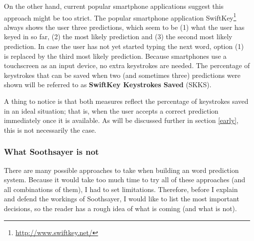 \documentclass[12pt]{article}
\begin{document}
On the other hand, current popular smartphone applications suggest this approach might be too strict. The popular smartphone application SwiftKey\footnote{\url{http://www.swiftkey.net/}} always shows the user three predictions, which seem to be (1) what the user has keyed in so far, (2) the most likely prediction and (3) the second most likely prediction. In case the user has not yet started typing the next word, option (1) is replaced by the third most likely prediction. Because smartphones use a touchscreen as an input device, no extra keystrokes are needed. The percentage of keystrokes that can be saved when two (and sometimes three) predictions were shown will be referred to as \textbf{SwiftKey Keystrokes Saved} (SKKS).

A thing to notice is that both measures reflect the percentage of keystrokes saved in an ideal situation; that is, when the user accepts a correct prediction immediately once it is available. As will be discussed further in section \ref{early}, this is not necessarily the case. 

\subsubsection{What Soothsayer is not} \label{whatnot}
There are many possible approaches to take when building an word prediction system. Because it would take too much time to try all of these approaches (and all combinations of them), I had to set limitations. Therefore, before I explain and defend the workings of Soothsayer, I would like to list the most important decisions, so the reader has a rough idea of what is coming (and what is not). 
\end{document}
